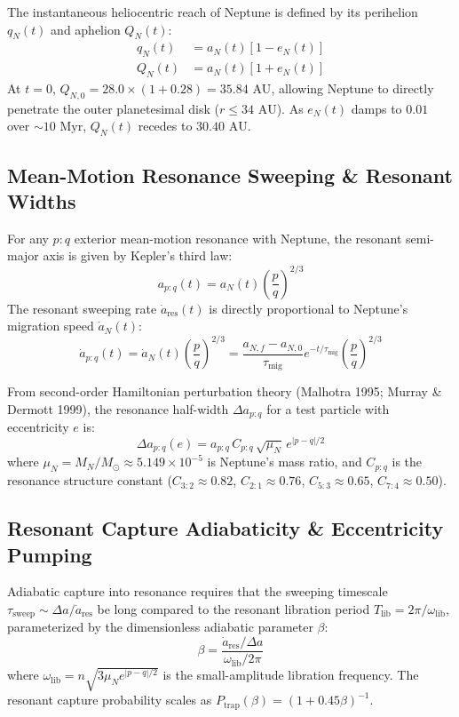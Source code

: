 \documentclass[11pt,a4paper]{article}
\begin{document}
The instantaneous heliocentric reach of Neptune is defined by its perihelion $q_N(t)$ and aphelion $Q_N(t)$:
\begin{align}
q_N(t) &= a_N(t) [1 - e_N(t)] \\
Q_N(t) &= a_N(t) [1 + e_N(t)]
\end{align}
At $t = 0$, $Q_{N,0} = 28.0 \times (1 + 0.28) = 35.84\text{ AU}$, allowing Neptune to directly penetrate the outer planetesimal disk ($r \le 34\text{ AU}$). As $e_N(t)$ damps to $0.01$ over $\sim 10\text{ Myr}$, $Q_N(t)$ recedes to $30.40\text{ AU}$.

\subsection{Mean-Motion Resonance Sweeping \& Resonant Widths}
For any $p:q$ exterior mean-motion resonance with Neptune, the resonant semi-major axis is given by Kepler's third law:
\begin{equation}
a_{p:q}(t) = a_N(t) \left( \frac{p}{q} \right)^{2/3}
\end{equation}
The resonant sweeping rate $\dot{a}_{\text{res}}(t)$ is directly proportional to Neptune's migration speed $\dot{a}_N(t)$:
\begin{equation}
\dot{a}_{p:q}(t) = \dot{a}_N(t) \left( \frac{p}{q} \right)^{2/3} = \frac{a_{N,f} - a_{N,0}}{\tau_{\text{mig}}} e^{-t/\tau_{\text{mig}}} \left( \frac{p}{q} \right)^{2/3}
\end{equation}

From second-order Hamiltonian perturbation theory (Malhotra 1995; Murray \& Dermott 1999), the resonance half-width $\Delta a_{p:q}$ for a test particle with eccentricity $e$ is:
\begin{equation}
\Delta a_{p:q}(e) = a_{p:q} \, C_{p:q} \, \sqrt{\mu_N} \, e^{|p-q|/2}
\end{equation}
where $\mu_N = M_N / M_\odot \approx 5.149 \times 10^{-5}$ is Neptune's mass ratio, and $C_{p:q}$ is the resonance structure constant ($C_{3:2} \approx 0.82$, $C_{2:1} \approx 0.76$, $C_{5:3} \approx 0.65$, $C_{7:4} \approx 0.50$).

\subsection{Resonant Capture Adiabaticity \& Eccentricity Pumping}
Adiabatic capture into resonance requires that the sweeping timescale $\tau_{\text{sweep}} \sim \Delta a / \dot{a}_{\text{res}}$ be long compared to the resonant libration period $T_{\text{lib}} = 2\pi / \omega_{\text{lib}}$, parameterized by the dimensionless adiabatic parameter $\beta$:
\begin{equation}
\beta = \frac{\dot{a}_{\text{res}} / \Delta a}{\omega_{\text{lib}} / 2\pi}
\end{equation}
where $\omega_{\text{lib}} = n \sqrt{3 \mu_N e^{|p-q|/2}}$ is the small-amplitude libration frequency. The resonant capture probability scales as $P_{\text{trap}}(\beta) = (1 + 0.45\beta)^{-1}$.
\end{document}
